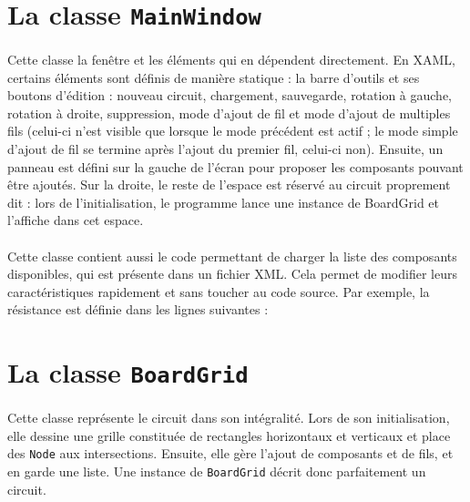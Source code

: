 \section{La classe \lstinline|MainWindow|}

\paragraph{}Cette classe la fenêtre et les éléments qui en dépendent directement. En XAML, certains éléments sont définis de manière statique : la barre d'outils et ses boutons d'édition : nouveau circuit, chargement, sauvegarde, rotation à gauche, rotation à droite, suppression, mode d'ajout de fil et mode d'ajout de multiples fils (celui-ci n'est visible que lorsque le mode précédent est actif ; le mode simple d'ajout de fil se termine après l'ajout du premier fil, celui-ci non). Ensuite, un panneau est défini sur la gauche de l'écran pour proposer les composants pouvant être ajoutés. Sur la droite, le reste de l'espace est réservé au circuit proprement dit : lors de l'initialisation, le programme lance une instance de BoardGrid et l'affiche dans cet espace.

\paragraph{}Cette classe contient aussi le code permettant de charger la liste des composants disponibles, qui est présente dans un fichier XML. Cela permet de modifier leurs caractéristiques rapidement et sans toucher au code source. Par exemple, la résistance est définie dans les lignes suivantes :




\section{La classe \lstinline|BoardGrid|}

\paragraph{}Cette classe représente le circuit dans son intégralité. Lors de son initialisation, elle dessine une grille constituée de rectangles horizontaux et verticaux et place des \lstinline|Node| aux intersections. Ensuite, elle gère l'ajout de composants et de fils, et en garde une liste. Une instance de \lstinline|BoardGrid| décrit donc parfaitement un circuit. 


